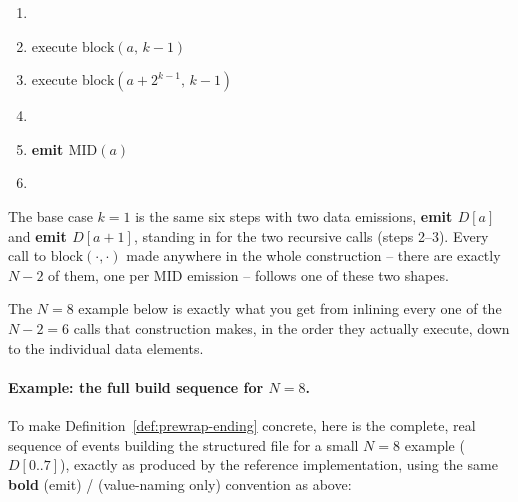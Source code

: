 \begin{enumerate}[itemsep=1pt, parsep=0pt, topsep=4pt]
\item {}
\item execute $\mathrm{block}(a,\, k{-}1)$
\item execute $\mathrm{block}(a + 2^{k-1},\, k{-}1)$
\item {}
\item \textbf{emit $\mathrm{MID}(a)$}
\item {}
\end{enumerate}

The base case $k=1$ is the same six steps with two data emissions,
\textbf{emit $D[a]$} and \textbf{emit $D[a{+}1]$}, standing in for the two
recursive calls (steps 2--3). Every call to $\mathrm{block}(\cdot,\cdot)$
made anywhere in the whole construction -- there are exactly $N-2$ of them,
one per $\mathrm{MID}$ emission -- follows one of these two shapes.

The $N=8$ example below is exactly what you get from inlining every one of
the $N-2=6$ calls that construction makes, in the order they actually
execute, down to the individual data elements.

\paragraph{Example: the full build sequence for $N=8$.} To make
Definition~\ref{def:prewrap-ending} concrete, here is the complete,
real sequence of events building the structured file for a small $N=8$
example ($D[0..7]$), exactly as produced by the reference implementation,
using the same \textbf{bold} (emit) /  (value-naming only)
convention as above:

